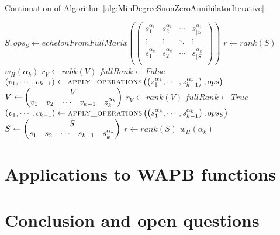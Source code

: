\documentclass[11pt]{llncs}
\begin{document}
\begin{algorithm}
	\caption{Continuation of Algorithm \ref{alg:MinDegreeSnonZeroAnnihilatorIterative}.}\label{alg:continueationMinDegreeSnonZeroAnnihilatorIterative}
	\begin{algorithmic}
		\State $S, ops_S \gets echelonFromFullMarix\left(
		\begin{pmatrix}
		s_1^{\alpha_1} &  s_2^{\alpha_1} & \cdots & s_{|S|}^{\alpha_{1}}\\
		\vdots &  \vdots & \ddots & \vdots\\
		s_{1}^{\alpha_k} &  s_{2}^{\alpha_k} & \cdots & s_{|S|}^{\alpha_{k}}\\
		\end{pmatrix}\right)$
		\State $r \gets rank(S)$
		\State \Return $w_H\left(\alpha_k\right)$
		\EndIf
		\State $r_V \gets rabk(V)$
		\State $fullRank \gets False$
		\State $\left(v_1, \cdots, v_{k-1}\right) \gets \mbox{\textsc{apply\_operations}}\left(\left(z_1^{\alpha_k}, \cdots, z_{k-1}^{\alpha_k}\right), ops\right)$ 
		\State $V \gets \begin{pmatrix}
			\multicolumn{5}{c}{\multirow{1}{*}{$V$}} \\
			v_1 & v_2 & \cdots & v_{k-1} & z_{k}^{\alpha_k}
		\end{pmatrix}$
		\State $r_V \gets rank(V)$
		\State $fullRank \gets True$
		\EndIf
		\State $\left(v_1, \cdots, v_{k-1}\right) \gets \mbox{\textsc{apply\_operations}}\left(\left(s_1^{\alpha_k}, \cdots, s_{k-1}^{\alpha_k}\right), ops_S\right)$ 
		\State $S \gets \begin{pmatrix}
		\multicolumn{5}{c}{\multirow{1}{*}{$S$}} \\
		s_1 & s_2 & \cdots & s_{k-1} & s_{k}^{\alpha_k}
		\end{pmatrix}$
		\State $r \gets rank(S)$
		\State \Return $w_H\left(\alpha_k\right)$
		\EndIf
		\EndWhile
	\end{algorithmic}
\end{algorithm}

\section{Applications to WAPB functions}

\section{Conclusion and open questions}
\end{document}
